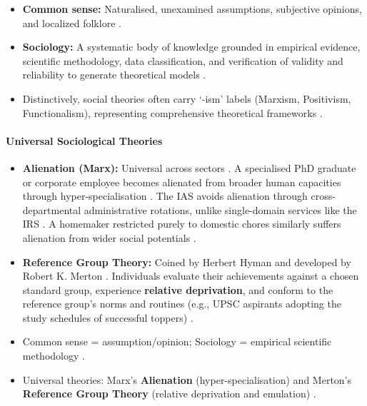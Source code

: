 \begin{KeyConcept}
\begin{itemize}
    \item \textbf{Common sense:} Naturalised, unexamined assumptions, subjective opinions, and localized folklore .
    \item \textbf{Sociology:} A systematic body of knowledge grounded in empirical evidence, scientific methodology, data classification, and verification of validity and reliability to generate theoretical models .
    \item Distinctively, social theories often carry `-ism' labels (Marxism, Positivism, Functionalism), representing comprehensive theoretical frameworks .
\end{itemize}
\end{KeyConcept}

\paragraph{Universal Sociological Theories}
\begin{KeyConcept}
\begin{itemize}
    \item \textbf{Alienation (Marx):} Universal across sectors . A specialised PhD graduate or corporate employee becomes alienated from broader human capacities through hyper-specialisation . The IAS avoids alienation through cross-departmental administrative rotations, unlike single-domain services like the IRS . A homemaker restricted purely to domestic chores similarly suffers alienation from wider social potentials .
    \item \textbf{Reference Group Theory:} Coined by Herbert Hyman and developed by Robert K. Merton . Individuals evaluate their achievements against a chosen standard group, experience \textbf{relative deprivation}, and conform to the reference group's norms and routines (e.g., UPSC aspirants adopting the study schedules of successful toppers) .
\end{itemize}
\end{KeyConcept}

\begin{QuickRevision}
\begin{itemize}
    \item Common sense = assumption/opinion; Sociology = empirical scientific methodology .
    \item Universal theories: Marx's \textbf{Alienation} (hyper-specialisation) and Merton's \textbf{Reference Group Theory} (relative deprivation and emulation) .
\end{itemize}
\end{QuickRevision}

